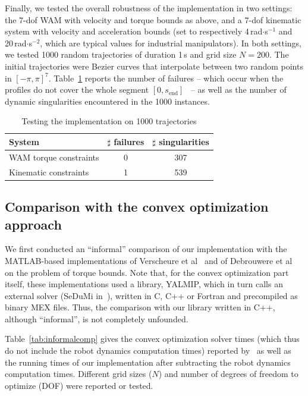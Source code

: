 \documentclass[9pt,technote]{IEEEtran}
\newcommand{\fin}{\mathrm{end}}
\begin{document}
Finally, we tested the overall robustness of the implementation in two
settings: the 7-dof WAM with velocity and torque bounds as above, and
a 7-dof kinematic system with velocity and acceleration bounds (set to
respectively 4\,rad$\cdot$s$^{-1}$ and 20\,rad$\cdot$s$^{-2}$, which
are typical values for industrial manipulators).  In both settings, we
tested 1000 random trajectories of duration 1\,s and grid size
$N=200$. The initial trajectories were Bezier curves that interpolate
between two random points in $[-\pi,\pi]^7$. Table~\ref{tab:robust}
reports the number of failures -- which occur when the profiles do not
cover the whole segment $[0,s_\fin]$~\cite{KS12rss} -- as well as the
number of dynamic singularities encountered in the 1000 instances.

\begin{table}[th]
  \caption{Testing the implementation on 1000 trajectories}    
  \centering
    \begin{tabular}{|l|c|c|}
      \hline
      System&$\sharp$ failures& $\sharp$ singularities\\
      \hline      
      WAM torque constraints&0&307\\
      Kinematic constraints&1&539\\
      \hline
     \end{tabular}
 \label{tab:robust}  
\end{table}





\subsection{Comparison with the convex optimization approach}
\label{sec:compconvex}

We first conducted an ``informal'' comparison of our implementation
with the MATLAB-based implementations of Verscheure et
al~\cite{VerX09tac} and of Debrouwere et al~\cite{DebX13tr} on the
problem of torque bounds. Note that, for the convex optimization part
itself, these implementations used a library, YALMIP, which in turn
calls an external solver (SeDuMi in~\cite{VerX09tac}), written in C,
C++ or Fortran and precompiled as binary MEX files. Thus, the
comparison with our library written in C++, although ``informal'', is
not completely unfounded.

Table~\ref{tab:informalcomp} gives the convex optimization
solver times (which thus do not include the robot dynamics computation
times) reported by~\cite{VerX09tac,DebX13tr} as well as the running
times of our implementation after subtracting the robot dynamics
computation times. Different grid sizes ($N$) and number of degrees of
freedom to optimize (DOF) were reported or tested.
\end{document}
